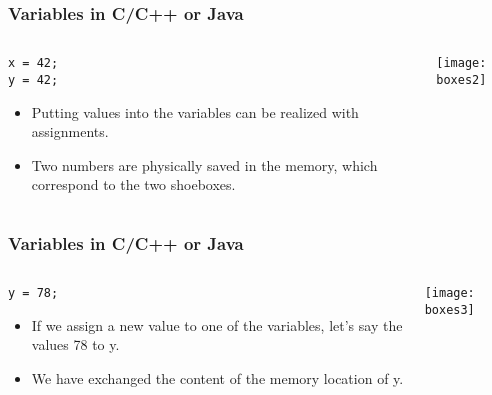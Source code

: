 \begin{frame}[fragile]\frametitle{Variables in C/C++ or Java}
  \begin{columns}[c]
    \begin{column}{0.5\linewidth}
  \begin{lstlisting}
x = 42;
y = 42; 
\end{lstlisting}
  \begin{itemize}
  \item Putting values into the variables can be realized with assignments. 
  \item Two numbers are physically saved in the memory, which correspond to the two shoeboxes.
    \end{itemize}
      \end{column}
    \begin{column}{0.4\linewidth}
    \begin{center}
\texttt{[image: boxes2]}
\end{center}
        \end{column}
  \end{columns}
  
\end{frame}


\begin{frame}[fragile]\frametitle{Variables in C/C++ or Java}
  \begin{columns}[c]
    \begin{column}{0.5\linewidth}
  \begin{lstlisting}
y = 78;
\end{lstlisting}
  \begin{itemize}
  \item If we assign a new value to one of the variables, let's say the values 78 to y.
  \item We have exchanged the content of the memory location of y.

    \end{itemize}
      \end{column}
    \begin{column}{0.4\linewidth}
    \begin{center}
\texttt{[image: boxes3]}
\end{center}
        \end{column}
  \end{columns}
  
\end{frame}

